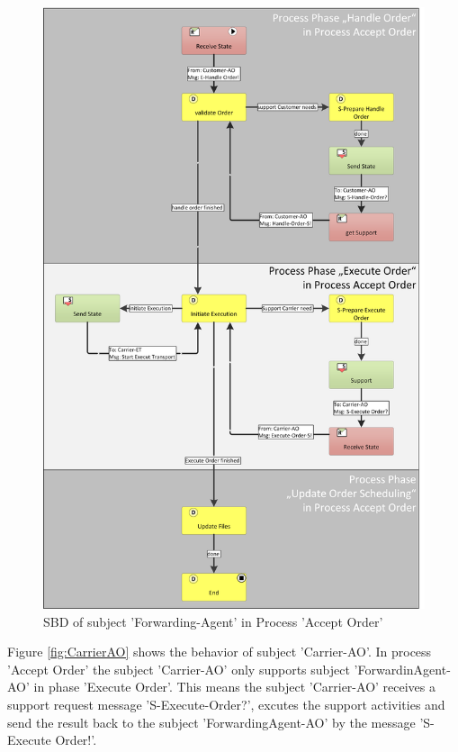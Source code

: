\begin{figure}[hbtp]
	\includegraphics[scale=0.7]{Figures/Chapter5/Subject-Phase/SBD-ForwardingAGentAO_NEW.png}
	\caption{SBD of subject 'Forwarding-Agent' in Process 'Accept Order'}
	\label{fig:SBD-ForwardingAGentAO}
\end{figure}


Figure \ref{fig:CarrierAO} shows the behavior of subject 'Carrier-AO'. In process 'Accept Order' the subject 'Carrier-AO' only supports subject 'ForwardinAgent-AO' in phase 'Execute Order'. This means the subject 'Carrier-AO' receives a support request message 'S-Execute-Order?', excutes the support activities and send the result back to the subject 'ForwardingAgent-AO' by the message 'S-Execute Order!'.

